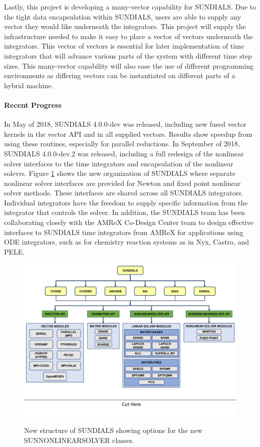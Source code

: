 Lastly, this project is developing a many-vector capability for SUNDIALS.  Due to the tight data encapsulation within SUNDIALS, users are able to supply any vector they would like underneath the integrators.  This project will supply the infrastructure needed to make it easy to place a vector of vectors underneath the integrators.  This vector of vectors is essential for later implementation of time integrators that will advance various parts of the system with different time step sizes.  This many-vector capability will also ease the use of different programming environments as differing vectors can be instantiated on different parts of a hybrid machine. 

\paragraph{Recent Progress}

In May of 2018, SUNDIALS 4.0.0-dev was released, including new fused vector kernels in the vector API and in all supplied vectors.  Results show speedup from using these routines, especially for parallel reductions.  In September of 2018, SUNDIALS 4.0.0-dev.2 was released, including a full redesign of the nonlinear solver interfaces to the time integrators and encapsulation of the nonlinear solevrs.  Figure \ref{fig:sunorg1} shows the new organization of SUNDIALS where separate nonlinear solver interfaces are provided for Newton and fixed point nonlinear solver methods.  These interfaces are shared across all SUNDIALS integrators.  
Individual integrators have the freedom to supply specific information from the integrator that controls the solver.  In addition, the SUNDIALS team has been collaborating closely with the AMReX Co-Design Center team to 
design effective interfaces to SUNDIALS time integrators from AMReX for applications using ODE integrators,
such as for chemistry reaction systems as in Nyx, Castro, and PELE.

\begin{figure}[htb]
	\centering
	\includegraphics[width=6in]{projects/2.3.3-MathLibs/2.3.3.05-SUNDIALS/sunorg1.pdf}
	\caption{\label{fig:sunorg1}New structure of SUNDIALS showing options for the new SUNNONLINEARSOLVER classes.}
\end{figure}

